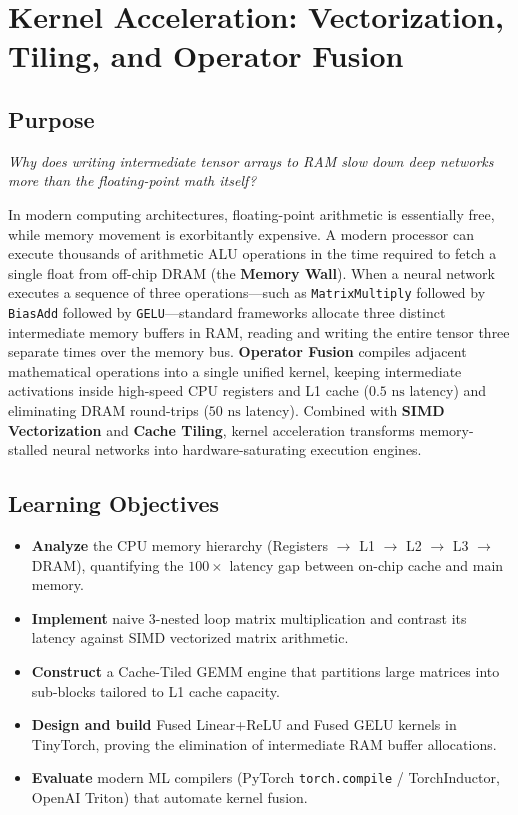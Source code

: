 \documentclass[
  letterpaper,
]{scrbook}
\providecommand{\tightlist}{%
  \setlength{\itemsep}{0pt}\setlength{\parskip}{0pt}}
\begin{document}
\chapter{Kernel Acceleration: Vectorization, Tiling, and Operator
Fusion}\label{kernel-acceleration-vectorization-tiling-and-operator-fusion}

\section*{Purpose}\label{purpose-19}


\emph{Why does writing intermediate tensor arrays to RAM slow down deep
networks more than the floating-point math itself?}

In modern computing architectures, floating-point arithmetic is
essentially free, while memory movement is exorbitantly expensive. A
modern processor can execute thousands of arithmetic ALU operations in
the time required to fetch a single float from off-chip DRAM (the
\textbf{Memory Wall}). When a neural network executes a sequence of
three operations---such as \texttt{MatrixMultiply} followed by
\texttt{BiasAdd} followed by \texttt{GELU}---standard frameworks
allocate three distinct intermediate memory buffers in RAM, reading and
writing the entire tensor three separate times over the memory bus.
\textbf{Operator Fusion} compiles adjacent mathematical operations into
a single unified kernel, keeping intermediate activations inside
high-speed CPU registers and L1 cache (\(0.5\text{ ns}\) latency) and
eliminating DRAM round-trips (\(50\text{ ns}\) latency). Combined with
\textbf{SIMD Vectorization} and \textbf{Cache Tiling}, kernel
acceleration transforms memory-stalled neural networks into
hardware-saturating execution engines.

\section{Learning Objectives}\label{learning-objectives-17}

\begin{itemize}
\tightlist
\item
  \textbf{Analyze} the CPU memory hierarchy (Registers \(\to\) L1
  \(\to\) L2 \(\to\) L3 \(\to\) DRAM), quantifying the \(100\times\)
  latency gap between on-chip cache and main memory.
\item
  \textbf{Implement} naive 3-nested loop matrix multiplication and
  contrast its latency against SIMD vectorized matrix arithmetic.
\item
  \textbf{Construct} a Cache-Tiled GEMM engine that partitions large
  matrices into sub-blocks tailored to L1 cache capacity.
\item
  \textbf{Design and build} Fused Linear+ReLU and Fused GELU kernels in
  TinyTorch, proving the elimination of intermediate RAM buffer
  allocations.
\item
  \textbf{Evaluate} modern ML compilers (PyTorch \texttt{torch.compile}
  / TorchInductor, OpenAI Triton) that automate kernel fusion.
\end{itemize}
\end{document}
